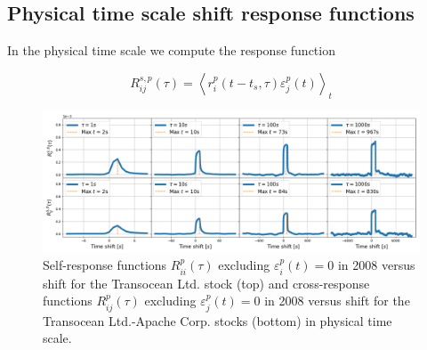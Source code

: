 \subsection{Physical time scale shift response functions}
\label{subsec:time_shift_physical}

In the physical time scale we compute the response function

\begin{equation}\label{eq:time_shift_physical}
    R_{ij}^{s, p}\left(\tau\right)=\left\langle r^{p}_{i}
    \left(t-t_{s},\tau\right) \varepsilon^{p}_{j}
    \left(t\right)\right\rangle _{t}
\end{equation}

\begin{figure}[htbp]
    \centering
    \includegraphics[width=\textwidth]{figures/04_shift_physical_RIG_APA.png}
    \caption{Self-response functions $R_{ii}^{p}\left(\tau\right)$ excluding
             $\varepsilon^{p}_{i}\left(t\right) = 0$ in 2008 versus shift for
             the Transocean Ltd. stock (top) and cross-response functions
             $R_{ij}^{p}\left(\tau\right)$ excluding
             $\varepsilon^{p}_{j}\left(t\right) = 0$ in 2008 versus shift for
             the Transocean Ltd.-Apache Corp. stocks (bottom) in physical time
             scale.}
    \label{fig:shift_physical_scale}
\end{figure}

